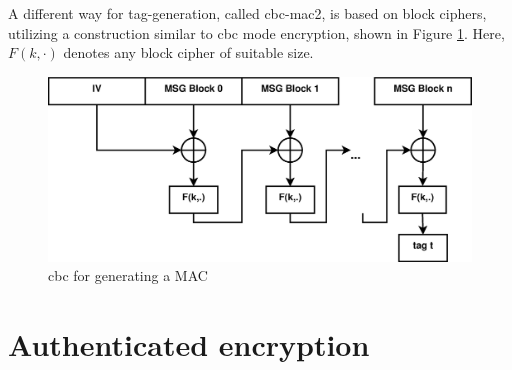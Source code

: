 A different way for tag-generation, called \gls{cbc}-\gls{mac2}, is based on block ciphers, utilizing a construction similar to \gls{cbc} mode encryption,
shown in Figure \ref{fig:cbc_MAC}. Here, $F(k,\cdot)$ denotes any block cipher of suitable size.
\begin{figure}\label{cbcMAC}
    \centering
    \includegraphics[width=1\textwidth]{figures/CBCMac.eps}
    \caption{\gls{cbc} for generating a MAC}
    \label{fig:cbc_MAC}
\end{figure}
\section{Authenticated encryption}\label{authEncrypt}

